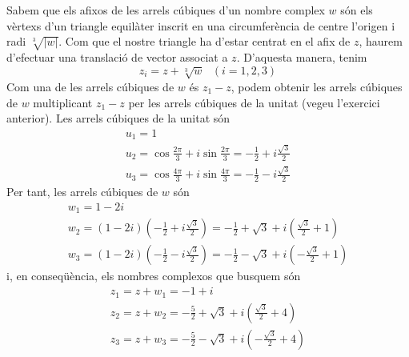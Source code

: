 \begin{solucio}
Sabem que els afixos de les arrels cúbiques d’un nombre
complex $w$ són els vèrtexs d’un triangle equilàter inscrit en
una circumferència de centre l’origen i radi $\sqrt[3]{\left\vert
w\right\vert }$. Com que el nostre triangle ha d’estar centrat en el
afix de $z$, haurem d’efectuar una translació de vector associat a $
z$. D’aquesta manera, tenim
\[
z_{i}=z+\sqrt[3]{w}~\ \ (i=1,2,3)
\]
Com una de les arrels cúbiques de $w$ és $z_{1}-z$, podem obtenir
les arrels cúbiques de $w$ multiplicant $z_{1}-z$ per les arrels cúbiques de la unitat (vegeu l’exercici anterior). Les arrels cúbiques de la unitat són
\[
\begin{array}{l}
u_{1}=1 \\
u_{2}=\cos \frac{2\pi }{3}+i\sin \frac{2\pi }{3}=-\frac{1}{2}+i\frac{\sqrt{3}
}{2} \\
u_{3}=\cos \frac{4\pi }{3}+i\sin \frac{4\pi }{3}=-\frac{1}{2}-i\frac{\sqrt{3}
}{2}
\end{array}
\]
Per tant, les arrels cúbiques de $w$ són
\[
\begin{array}{l}
w_{1}=1-2i \\
w_{2}=(1-2i)\left( -\frac{1}{2}+i\frac{\sqrt{3}}{2}\right) =-\frac{1}{2}+
\sqrt{3}+i\left( \frac{\sqrt{3}}{2}+1\right) \\
w_{3}=(1-2i)\left( -\frac{1}{2}-i\frac{\sqrt{3}}{2}\right) =-\frac{1}{2}-
\sqrt{3}+i\left( -\frac{\sqrt{3}}{2}+1\right)
\end{array}
\]
i, en conseqüència, els nombres complexos que busquem són
\[
\begin{array}{l}
z_{1}=z+w_{1}=-1+i \\
z_{2}=z+w_{2}=-\frac{5}{2}+\sqrt{3}+i\left( \frac{\sqrt{3}}{2}+4\right) \\
z_{3}=z+w_{3}=-\frac{5}{2}-\sqrt{3}+i\left( -\frac{\sqrt{3}}{2}+4\right)
\end{array}
\]
\end{solucio}
